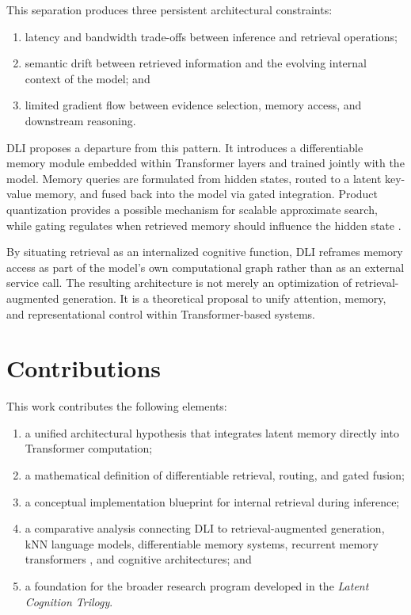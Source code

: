 This separation produces three persistent architectural constraints:

\begin{enumerate}
    \item latency and bandwidth trade-offs between inference and retrieval operations;
    \item semantic drift between retrieved information and the evolving internal context of the model; and
    \item limited gradient flow between evidence selection, memory access, and downstream reasoning.
\end{enumerate}

DLI proposes a departure from this pattern. It introduces a differentiable memory module embedded within Transformer layers and trained jointly with the model. Memory queries are formulated from hidden states, routed to a latent key-value memory, and fused back into the model via gated integration. Product quantization provides a possible mechanism for scalable approximate search, while gating regulates when retrieved memory should influence the hidden state \cite{Jgou2011, Johnson2021, Lepikhin2020}.

By situating retrieval as an internalized cognitive function, DLI reframes memory access as part of the model's own computational graph rather than as an external service call. The resulting architecture is not merely an optimization of retrieval-augmented generation. It is a theoretical proposal to unify attention, memory, and representational control within Transformer-based systems.

\section*{Contributions}
This work contributes the following elements:

\begin{enumerate}
    \item a unified architectural hypothesis that integrates latent memory directly into Transformer computation;
    \item a mathematical definition of differentiable retrieval, routing, and gated fusion;
    \item a conceptual implementation blueprint for internal retrieval during inference;
    \item a comparative analysis connecting DLI to retrieval-augmented generation, kNN language models, differentiable memory systems, recurrent memory transformers \cite{Wu2022}, and cognitive architectures; and
    \item a foundation for the broader research program developed in the \textit{Latent Cognition Trilogy}.
\end{enumerate}

